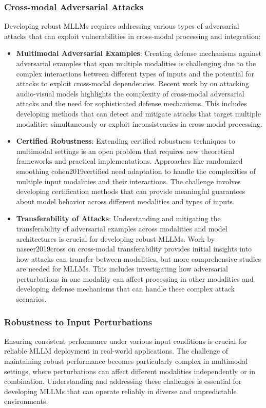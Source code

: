 \subsubsection{Cross-modal Adversarial Attacks}
Developing robust MLLMs requires addressing various types of adversarial attacks that can exploit vulnerabilities in cross-modal processing and integration:

\begin{itemize}
    \item \textbf{Multimodal Adversarial Examples}: Creating defense mechanisms against adversarial examples that span multiple modalities is challenging due to the complex interactions between different types of inputs and the potential for attacks to exploit cross-modal dependencies. Recent work by on attacking audio-visual models highlights the complexity of cross-modal adversarial attacks and the need for sophisticated defense mechanisms. This includes developing methods that can detect and mitigate attacks that target multiple modalities simultaneously or exploit inconsistencies in cross-modal processing.
    
    \item \textbf{Certified Robustness}: Extending certified robustness techniques to multimodal settings is an open problem that requires new theoretical frameworks and practical implementations. Approaches like randomized smoothing cohen2019certified need adaptation to handle the complexities of multiple input modalities and their interactions. The challenge involves developing certification methods that can provide meaningful guarantees about model behavior across different modalities and types of inputs.
    
    \item \textbf{Transferability of Attacks}: Understanding and mitigating the transferability of adversarial examples across modalities and model architectures is crucial for developing robust MLLMs. Work by naseer2019cross on cross-modal transferability provides initial insights into how attacks can transfer between modalities, but more comprehensive studies are needed for MLLMs. This includes investigating how adversarial perturbations in one modality can affect processing in other modalities and developing defense mechanisms that can handle these complex attack scenarios.

\end{itemize}

\subsubsection{Robustness to Input Perturbations}
Ensuring consistent performance under various input conditions is crucial for reliable MLLM deployment in real-world applications. The challenge of maintaining robust performance becomes particularly complex in multimodal settings, where perturbations can affect different modalities independently or in combination. Understanding and addressing these challenges is essential for developing MLLMs that can operate reliably in diverse and unpredictable environments.

